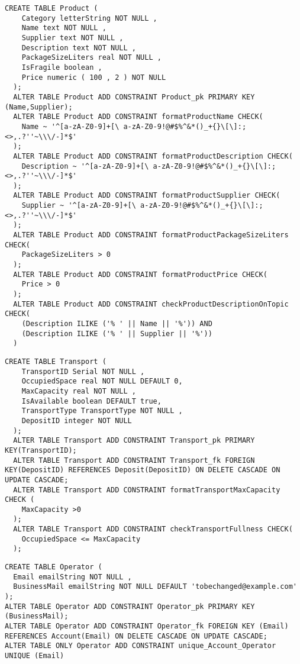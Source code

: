 \newpage

\begin{lstlisting}[caption={Creazione della tabella \textbf{Product}}]
  CREATE TABLE Product (
    Category letterString NOT NULL ,
    Name text NOT NULL ,
    Supplier text NOT NULL ,
    Description text NOT NULL ,
    PackageSizeLiters real NOT NULL ,
    IsFragile boolean ,
    Price numeric ( 100 , 2 ) NOT NULL
  );
  ALTER TABLE Product ADD CONSTRAINT Product_pk PRIMARY KEY (Name,Supplier);
  ALTER TABLE Product ADD CONSTRAINT formatProductName CHECK(
    Name ~ '^[a-zA-Z0-9]+[\ a-zA-Z0-9!@#$%^&*()_+{}\[\]:;<>,.?''~\\\/-]*$'
  );
  ALTER TABLE Product ADD CONSTRAINT formatProductDescription CHECK(
    Description ~ '^[a-zA-Z0-9]+[\ a-zA-Z0-9!@#$%^&*()_+{}\[\]:;<>,.?''~\\\/-]*$'
  );
  ALTER TABLE Product ADD CONSTRAINT formatProductSupplier CHECK(
    Supplier ~ '^[a-zA-Z0-9]+[\ a-zA-Z0-9!@#$%^&*()_+{}\[\]:;<>,.?''~\\\/-]*$'
  );
  ALTER TABLE Product ADD CONSTRAINT formatProductPackageSizeLiters CHECK(
    PackageSizeLiters > 0
  );
  ALTER TABLE Product ADD CONSTRAINT formatProductPrice CHECK(
    Price > 0
  );
  ALTER TABLE Product ADD CONSTRAINT checkProductDescriptionOnTopic CHECK(
    (Description ILIKE ('% ' || Name || '%')) AND 
    (Description ILIKE ('% ' || Supplier || '%'))
  )
\end{lstlisting}

\newpage
\begin{lstlisting}[caption={Creazione della tabella \textbf{Transport}}]
  CREATE TABLE Transport (
    TransportID Serial NOT NULL ,
    OccupiedSpace real NOT NULL DEFAULT 0,
    MaxCapacity real NOT NULL ,
    IsAvailable boolean DEFAULT true, 
    TransportType TransportType NOT NULL ,
    DepositID integer NOT NULL
  );
  ALTER TABLE Transport ADD CONSTRAINT Transport_pk PRIMARY KEY(TransportID);
  ALTER TABLE Transport ADD CONSTRAINT Transport_fk FOREIGN KEY(DepositID) REFERENCES Deposit(DepositID) ON DELETE CASCADE ON UPDATE CASCADE; 
  ALTER TABLE Transport ADD CONSTRAINT formatTransportMaxCapacity CHECK (
    MaxCapacity >0
  );
  ALTER TABLE Transport ADD CONSTRAINT checkTransportFullness CHECK(
    OccupiedSpace <= MaxCapacity
  );
\end{lstlisting}

\begin{lstlisting}[caption={Creazione della tabella \textbf{Operator}}]
  CREATE TABLE Operator (
  Email emailString NOT NULL ,
  BusinessMail emailString NOT NULL DEFAULT 'tobechanged@example.com'
);
ALTER TABLE Operator ADD CONSTRAINT Operator_pk PRIMARY KEY (BusinessMail);
ALTER TABLE Operator ADD CONSTRAINT Operator_fk FOREIGN KEY (Email) REFERENCES Account(Email) ON DELETE CASCADE ON UPDATE CASCADE;
ALTER TABLE ONLY Operator ADD CONSTRAINT unique_Account_Operator UNIQUE (Email)
\end{lstlisting}


